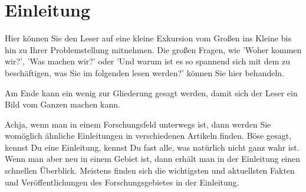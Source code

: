 \section*{Einleitung}

Hier können Sie den Leser auf eine kleine Exkursion
vom Großen ins Kleine bis hin zu Ihrer Problemstellung mitnehmen.
Die großen Fragen, wie 'Woher kommen wir?', 'Was machen wir?' 
oder 'Und warum ist es so spannend sich mit dem zu 
beschäftigen, was Sie im folgenden lesen werden?' können Sie
hier behandeln.

Am Ende kann ein wenig zur Gliederung gesagt werden,
damit sich der Leser ein Bild vom Ganzen machen kann.

Achja, wenn man in einem Forschungsfeld unterwegs ist, dann
werden Sie womöglich ähnliche Einleitungen in verschiedenen
Artikeln finden. Böse gesagt, kennst Du eine 
Einleitung, kennst Du fast alle, was natürlich nicht
ganz wahr ist. Wenn man aber neu in einem Gebiet
ist, dann erhält man in der Einleitung einen schnellen Überblick.
Meistens finden sich die wichtigsten und aktuellsten 
Fakten und Veröffentlichungen des Forschungsgebietes in der Einleitung.